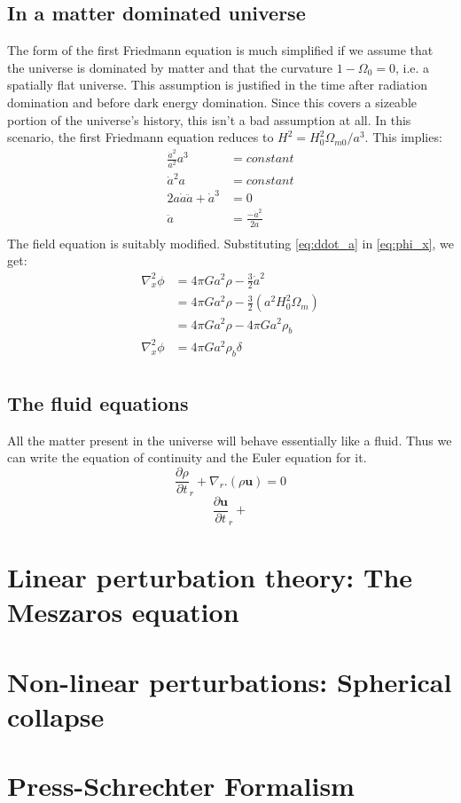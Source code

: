 \documentclass[12pt,a4paper,oneside]{book}
\begin{document}
		\subsection{In a matter dominated universe}
			The form of the first Friedmann equation is much simplified if we assume that the universe is dominated by matter and that the curvature $1-\Omega_0=0$, i.e. a spatially flat universe. This assumption is justified in the time after radiation domination and before dark energy domination. Since this covers a sizeable portion of the universe's history, this isn't a bad assumption at all. In this scenario, the first Friedmann equation reduces to $H^2=H_0^2\Omega_{m0}/{a^3}$. This implies:
			\begin{equation}
				\begin{aligned}
					\frac{\dot{a}^2}{a^2}a^3&=constant\\
					\dot{a}^2a&=constant\\
					2a\dot{a}\ddot{a}+\dot{a}^3&=0\\
					\ddot{a}&=\frac{-\dot{a}^2}{2a}\\
				\end{aligned}
				\label{eq:ddot_a}
			\end{equation}
			The field equation is suitably modified. Substituting \ref{eq:ddot_a} in \ref{eq:phi_x}, we get:
			\begin{equation}
				\begin{aligned}
					\nabla_x^2\phi&=4\pi G a^2\rho -\frac{3}{2}\dot{a}^2\\
											   &=4\pi G a^2\rho- \frac{3}{2}\left(a^2H_0^2\Omega_m\right)\\
												&=4\pi Ga^2\rho-4\pi Ga^2\rho_b\\
					\nabla_x^2\phi&=4\pi G a^2\rho_b\delta\\
				\end{aligned}
			\end{equation}
		\subsection{The fluid equations}
			All the matter present in the universe will behave essentially like a fluid. Thus we can write the equation of continuity and the Euler equation for it.
			\begin{equation}
				\frac{\partial \rho}{\partial t}_r+\nabla_r.(\rho\mathbf{u})=0
			\end{equation}
			\begin{equation}
				\frac{\partial\mathbf{u}}{\partial t}_r+
			\end{equation}
	\section{Linear perturbation theory: The Meszaros equation}
	\section{Non-linear perturbations: Spherical collapse}
	\section{Press-Schrechter Formalism}
\end{document}
